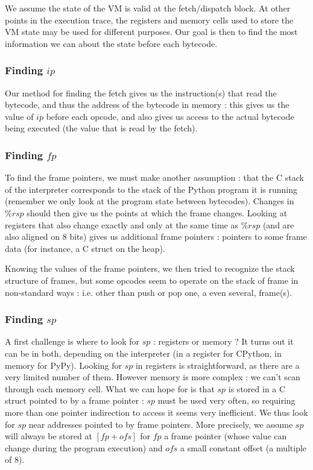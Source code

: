 \documentclass[english]{article}
\begin{document}
We assume the state of the VM is valid at the fetch/dispatch block. At other points in the execution trace, the registers and memory cells used to store the VM state may be used for different purposes. Our goal is then to find the most information we can about the state before each bytecode.

\subsubsection{Finding $ip$}

Our method for finding the fetch gives us the instruction(s) that read the bytecode, and thus the address of the bytecode in memory : this gives us the value of $ip$ before each opcode, and also gives us access to the actual bytecode being executed (the value that is read by the fetch).

\subsubsection{Finding $fp$}

To find the frame pointers, we must make another assumption : that the C stack of the interpreter corresponds to the stack of the Python program it is running (remember we only look at the program state between bytecodes). Changes in $\%rsp$ should then give us the points at which the frame changes. Looking at registers that also change exactly and only at the same time as $\%rsp$ (and are also aligned on 8 bits) gives us additional frame pointers : pointers to some frame data (for instance, a C struct on the heap).

Knowing the values of the frame pointers, we then tried to recognize the stack structure of frames, but some opcodes seem to operate on the stack of frame in non-standard ways : i.e. other than push or pop one, a even several, frame(s).

\subsubsection{Finding $sp$}

A first challenge is where to look for $sp$ : registers or memory ? It turns out it can be in both, depending on the interpreter (in a register for CPython, in memory for PyPy). Looking for $sp$ in registers is straightforward, as there are a very limited number of them. However memory is more complex : we can't scan through each memory cell. What we can hope for is that $sp$ is stored in a C struct pointed to by a frame pointer : $sp$ must be used very often, so requiring more than one pointer indirection to access it seems very inefficient. We thus look for $sp$ near addresses pointed to by frame pointers.  More precisely, we assume $sp$ will always be stored at $[fp + ofs]$ for $fp$ a frame pointer (whose value can change during the program execution) and $ofs$ a small constant offset (a multiple of 8).
\end{document}
